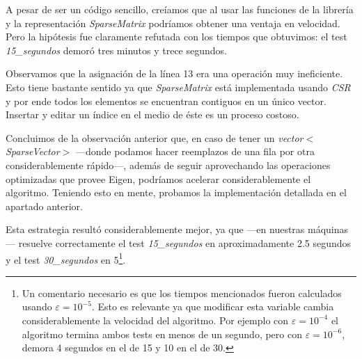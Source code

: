 \vspace{1em}
A pesar de ser un código sencillo, creíamos que al usar las funciones de la librería y la representación \textit{SparseMatrix} podríamos obtener una ventaja en velocidad. Pero la hipótesis fue claramente refutada con los tiempos que obtuvimos: el test \textit{15\_segundos} demoró tres minutos y trece segundos.

\vspace{1em}
Observamos que la asignación de la línea 13 era una operación muy ineficiente. Esto tiene bastante sentido ya que \textit{SparseMatrix} está implementada usando \textit{CSR} y por ende todos los elementos se encuentran contiguos en un único vector. Insertar y editar un índice en el medio de éste es un proceso costoso.
 
\vspace{1em}
Concluimos de la observación anterior que, en caso de tener un \textit{vector$<$SparseVector$>$} ---donde podamos hacer reemplazos de una fila por otra considerablemente rápido---, además de seguir aprovechando las operaciones optimizadas que provee Eigen, podríamos acelerar considerablemente el algoritmo. Teniendo esto en mente, probamos la implementación detallada en el apartado anterior.

\vspace{1em}
Esta estrategia resultó considerablemente mejor, ya que ---en nuestras máquinas--- resuelve correctamente el test \textit{15\_segundos} en aproximadamente 2.5 segundos y el test \textit{30\_segundos} en 5\footnote{Un comentario necesario es que los tiempos mencionados fueron calculados usando $\varepsilon = 10^{-5}$. Esto es relevante ya que modificar esta variable cambia considerablemente la velocidad del algoritmo. Por ejemplo con $\varepsilon = 10^{-4}$ el algoritmo termina ambos tests en menos de un segundo, pero con $\varepsilon = 10^{-6}$, demora 4 segundos en el de 15 y 10 en el de 30. %
}.


% 


